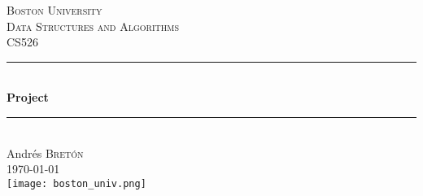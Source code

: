 \begin{titlepage}

\newcommand{\HRule}{\rule{\linewidth}{0.5mm}} %

\center %


\textsc{\LARGE Boston University}\\[1.5cm] %
\textsc{\Large Data Structures and Algorithms}\\[0.5cm] %
\textsc{\large CS526}\\[0.5cm] %


\HRule \\[0.4cm]
{ \huge \bfseries Project}\\[0.4cm] %
\HRule \\[1.5cm]


\Large Andrés \textsc{Bretón}\\[3cm] %


{\large \today}\\[2cm] %


\texttt{[image: boston\_univ.png]}\\[1cm] %


\vfill %

\end{titlepage}

